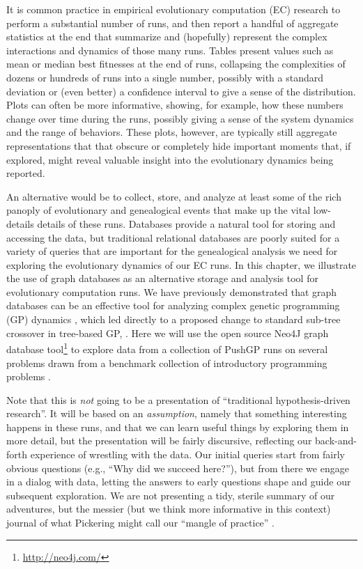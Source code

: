 It is common practice in empirical evolutionary computation (EC) 
research to perform a substantial number of runs, and then 
report a handful of aggregate statistics at the end that summarize and (hopefully) represent 
the complex interactions and dynamics of those many runs. Tables present values such 
as mean or median best fitnesses at the end of runs, collapsing the complexities of dozens or 
hundreds of runs into a single number, possibly with a standard deviation or (even better) a 
confidence interval to give a sense of the distribution. Plots can often be more informative, 
showing, for example, how these numbers change over time during the runs, possibly giving a sense of 
the system dynamics and the range of behaviors. These plots, however, are typically still aggregate representations that
that obscure or completely hide important moments that, if explored, might reveal valuable insight into the 
evolutionary dynamics being reported.

An alternative would be to collect, store, and analyze at least some of the rich panoply of 
evolutionary and genealogical events that make up the vital low-details details of these runs. 
Databases provide a natural tool for 
storing and accessing the data, but traditional relational
databases are poorly suited for a variety of queries that are important for the genealogical analysis
we need for exploring the evolutionary dynamics of our EC runs.
In this chapter, we illustrate the use of graph databases as an alternative storage and analysis tool for
evolutionary computation runs. We have previously demonstrated that graph databases
can be an effective tool for analyzing complex genetic programming (GP) dynamics \citep{donatuccianalysis}, which led directly
to a proposed change to standard sub-tree crossover in tree-based GP, \citep{mcphee:GECCO15}.
Here we will use the open source Neo4J graph database tool\footnote{\url{http://neo4j.com/}} 
to explore data from a
collection of PushGP runs \citep{Helmuth:2015:GPTP} on several problems drawn from a benchmark collection of introductory 
programming problems \citep{Helmuth:2015:GECCO}.

Note that this is \emph{not} going to be a presentation of ``traditional hypothesis-driven 
research''. It will be based on an \emph{assumption}, namely that something interesting happens in
these runs, and that we can learn useful things by exploring them in more detail, but the presentation
will be fairly discursive, reflecting our back-and-forth experience of wrestling with the data. Our
initial queries start from fairly obvious questions (e.g., ``Why did we succeed here?''), but from
there we engage in a dialog with data, letting the answers to early questions shape and guide our 
subsequent exploration. We are not presenting a tidy, sterile summary of our adventures, but
the messier (but we think more informative in this context) journal of what Pickering might call
our ``mangle of practice'' \citep{smith2008mangle, pickering:AJS:1993}.

